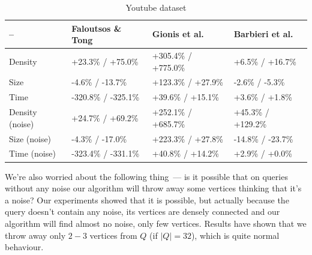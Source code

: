 \begin{table}[!h]
\centering
\caption{Youtube dataset}\label{results-youtube}
  \begin{tabular}{| l | l | l | p{3.8cm} |}
  \hline
  -- & Faloutsos \& Tong & Gionis et al. & Barbieri et al. \\\hline
  Density         & +23.3\%  / +75.0\%  & +305.4\% / +775.0\% & +6.5\%  / +16.7\%  \\\hline
  Size            & -4.6\%   / -13.7\%  & +123.3\% / +27.9\%  & -2.6\%  / -5.3\%   \\\hline
  Time            & -320.8\% / -325.1\% & +39.6\%  / +15.1\%  & +3.6\%  / +1.8\%   \\\hline
  Density (noise) & +24.7\%  / +69.2\%  & +252.1\% / +685.7\% & +45.3\% / +129.2\% \\\hline
  Size (noise)    & -4.3\%   / -17.0\%  & +223.3\% / +27.8\%  & -14.8\% / -23.7\%  \\\hline
  Time (noise)    & -323.4\% / -331.1\% & +40.8\%  / +14.2\%  & +2.9\%  / +0.0\%   \\\hline
  \end{tabular}
\end{table}
\FloatBarrier

We're also worried about the following thing~--- is it possible that on queries without any noise our algorithm will throw away some vertices thinking that it's a noise? Our experiments showed that it is possible, but actually because the query doesn't contain any noise, its vertices are densely connected and our algorithm will find almost no noise, only few vertices. Results have shown that we throw away only $2-3$ vertices from $Q$ (if $|Q| = 32$), which is quite normal behaviour.
